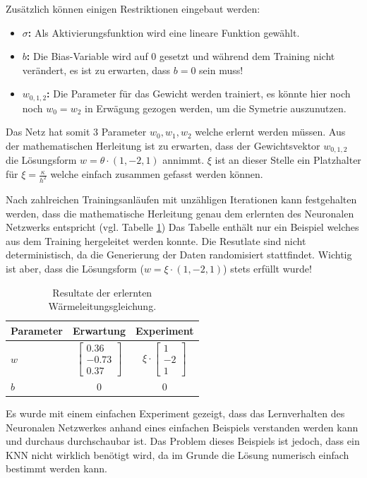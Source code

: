 Zusätzlich können einigen Restriktionen eingebaut werden:
\begin{itemize}
	\item {\textbf{$\sigma$:} Als Aktivierungsfunktion wird eine lineare Funktion gewählt.}
	\item {\textbf{$b$: } Die Bias-Variable wird auf 0 gesetzt und während dem Training nicht verändert, es ist zu erwarten, dass $b=0$ sein muss!}
	\item {\textbf{$w_{0,1,2}$: } Die Parameter für das Gewicht werden trainiert, es könnte hier noch noch $w_0 = w_2$ in Erwägung gezogen werden, um die Symetrie auszunutzen.}
\end{itemize}
Das Netz hat somit 3 Parameter $w_0, w_1, w_2$ welche erlernt werden müssen. Aus der mathematischen Herleitung ist zu erwarten, dass der Gewichtsvektor $w_{0,1,2}$ die Lösungsform $w = \theta \cdot (1, -2, 1)$ annimmt. $\xi$ ist an dieser Stelle ein Platzhalter für $\xi = \frac{\kappa}{h^{2}}$ welche einfach zusammen gefasst werden können.


Nach zahlreichen Trainingsanläufen mit unzähligen Iterationen kann festgehalten werden, dass die mathematische Herleitung genau dem erlernten des Neuronalen Netzwerks entspricht (vgl. Tabelle \ref{tbl:result_heat}) Das Tabelle enthält nur ein Beispiel welches aus dem Training hergeleitet werden konnte. Die Resutlate sind nicht deterministisch, da die Generierung der Daten randomisiert stattfindet. Wichtig ist aber, dass die Lösungsform ($w = \xi \cdot (1, -2, 1)$) stets erfüllt wurde!

\begin{table}[h]
	\centering
	\def\arraystretch{1.1}
	\begin{tabular}{l|c|c}
		Parameter & Erwartung & Experiment \\
		\hline
		$w$ & $\begin{bmatrix} 0.36 \\ -0.73 \\ 0.37 \end{bmatrix}$ & $ \xi \cdot \begin{bmatrix} 1 \\ -2 \\ 1 \end{bmatrix}$ \\
		$b$ & 0 & 0 \\
	\end{tabular}
	\label{tbl:result_heat}
	\caption{Resultate der erlernten Wärmeleitungsgleichung.}
\end{table}

Es wurde mit einem einfachen Experiment gezeigt, dass das Lernverhalten des Neuronalen Netzwerkes anhand eines einfachen Beispiels verstanden werden kann und durchaus durchschaubar ist. Das Problem dieses Beispiels ist jedoch, dass ein KNN nicht wirklich benötigt wird, da im Grunde die Lösung numerisch einfach bestimmt werden kann.